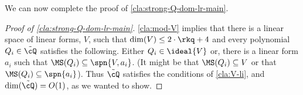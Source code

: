 We can now complete the proof of  \autoref{cla:strong-Q-dom-lr-main}.
\begin{proof}[Proof of \autoref{cla:strong-Q-dom-lr-main}]
		\autoref{cla:mod-V} implies that there is a linear space of linear forms, $V$, such that $\dim(V) \leq 2\cdot\rkq+ 4$ and  every polynomial $Q_i \in \tilde{\cQ}$ satisfies the following. Either $Q_i \in \ideal{V}$ or, there is a linear form $a_i$ such that $\MS(Q_i) \subseteq \spn{V,a_i}$. (It might be that $\MS(Q_i) \subseteq V$ or that $\MS(Q_i) \subseteq \spn{a_i}$). Thus $\tilde{\cQ}$ satisfies the conditions of \autoref{cla:V-li}, and $\dim(\tilde{\cQ}) = O(1)$, as we wanted to show.

\end{proof}





